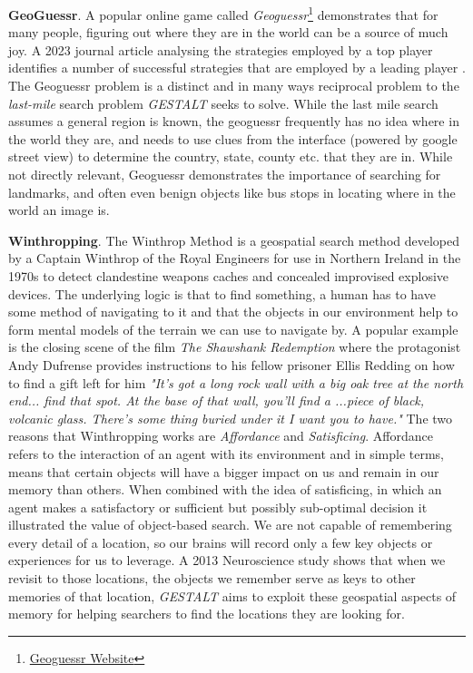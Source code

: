 \textbf{GeoGuessr}. A popular online game called \textit{Geoguessr}\footnote{\href{https://www.geoguessr.com/}{Geoguessr Website}} demonstrates that for many people, figuring out where they are in the world can be a source of much joy. 
A 2023 journal article analysing the strategies employed by a top player identifies a number of successful strategies that are employed by a leading player \cite{Berners-Lee2023}. 
The Geoguessr problem is a distinct and in many ways reciprocal problem to the \textit{last-mile} search problem \textit{GESTALT} seeks to solve. While the last mile search assumes a general region is known, the geoguessr frequently has no idea where in the world they are, and needs to use clues from the interface (powered by google street view) to determine the country, state, county etc. that they are in. 
While not directly relevant, Geoguessr demonstrates the importance of searching for landmarks, and often even benign objects like bus stops in locating where in the world an image is. 

\textbf{Winthropping}. The Winthrop Method is a geospatial search method developed by a Captain Winthrop of the Royal Engineers for use in Northern Ireland in the 1970s\cite{Keatley2021} to detect clandestine weapons caches and concealed improvised explosive devices. 
The underlying logic is that to find something, a human has to have some method of navigating to it and that the objects in our environment help to form mental models of the terrain we can use to navigate by. 
A popular example is the closing scene of the film \textit{The Shawshank Redemption} where the protagonist Andy Dufrense provides instructions to his fellow prisoner Ellis Redding on how to find a gift left for him \textit{"It’s got a long rock wall with a big oak tree at the north end... find that spot. At the base of that wall, you’ll find a ...piece of black, volcanic glass. There’s some thing buried under it I want you to have."} 
The two reasons that Winthropping works are \textit{Affordance} and \textit{Satisficing}. Affordance refers to the interaction of an agent with its environment and in simple terms, means that certain objects will have a bigger impact on us and remain in our memory than others. 
When combined with the idea of satisficing, in which an agent makes a satisfactory or sufficient but possibly sub-optimal decision it illustrated the value of object-based search. 
We are not capable of remembering every detail of a location, so our brains will record only a few key objects or experiences for us to leverage. 
A 2013 Neuroscience study shows that when we revisit to those locations, the objects we remember serve as keys to other memories of that location\cite{Miller2013}, \textit{GESTALT} aims to exploit these geospatial aspects of memory for helping searchers to find the locations they are looking for.


